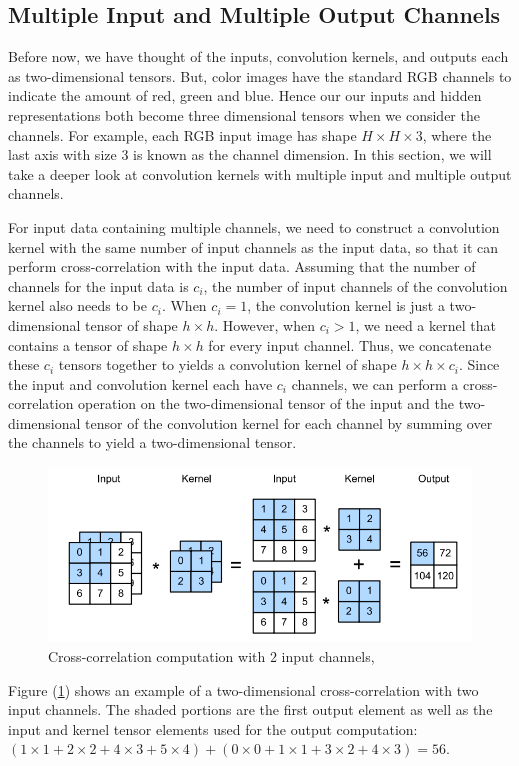\documentclass[12pt]{report}
\numberwithin{equation}{section}
\begin{document}
\subsection{Multiple Input and Multiple Output Channels}
Before now, we have thought of the inputs, convolution kernels, and outputs each as two-dimensional tensors. But, color images have the standard RGB channels to indicate the amount of red, green and blue. Hence our our inputs and hidden representations both become three dimensional tensors when we consider the channels. For example, each RGB input image has shape $H \times H \times 3$, where the last axis with size $3$ is known as the channel dimension. In this section, we will take a deeper look at convolution kernels with multiple input and multiple output channels.

For input data containing multiple channels, we need to construct a convolution kernel with the same number of input channels as the input data, so that it can perform cross-correlation with the input data. Assuming that the number of channels for the input data is $c_i$, the number of input channels of the convolution kernel also needs to be $c_i$. When $c_i = 1$, the convolution kernel is just a two-dimensional tensor of shape $h \times h$. However, when $c_i > 1$, we need a kernel that contains a tensor of shape $h \times h$ for every input channel. Thus, we concatenate these $c_i$ tensors together to yields a convolution kernel of shape $h \times h \times c_i$. Since the input and convolution kernel each have $c_i$ channels, we can perform a cross-correlation operation on the two-dimensional tensor of the input and the two-dimensional tensor of the convolution kernel for each channel by summing over the channels to yield a two-dimensional tensor. 
\begin{figure}[H]
\centering
\includegraphics[scale=0.9]{png/cross_corr_2_dim.png}
\caption[Cross-correlation computation with $2$ input channels]{Cross-correlation computation with $2$ input channels, {\cite{zhang2020dive}}}
\label{fig:2-dim}
\end{figure} \noindent
Figure (\ref{fig:2-dim}) shows an example of a two-dimensional cross-correlation with two input channels. The shaded portions are the first output element as well as the input and kernel tensor elements used for the output computation: $(1\times 1+2\times 2+4\times 3+5\times 4)+(0\times 0+1\times 1+3\times 2+4\times 3) = 56 $.
\end{document}
